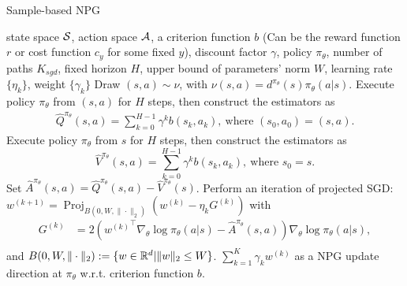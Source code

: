 \begin{algorithm}[htb!]
   \caption{Sample-based NPG}
   \label{Algorithm_sample_based_NPG}
\begin{algorithmic}
    state space ${\mathcal{S}}$, action space ${\mathcal{A}}$, a criterion function $b$ (Can be the reward function $r$ or cost function $c_y$ for some fixed $y$), discount factor $\gamma$, policy $\pi_\theta$, number of paths $K_{sgd}$, fixed horizon $H$, upper bound of parameters' norm $W$, learning rate $\{\eta_k\}$, weight $\{\gamma_k\}$
      \STATE Draw $(s,a)\sim \nu$, with $\nu(s,a)=d^{\pi_\theta}(s)\pi_\theta(a|s)$.
   \STATE Execute policy $\pi_\theta$ from $(s,a)$ for $H$ steps, then construct the estimators as
   $$
   \begin{aligned}
   \widehat Q^{\pi_\theta}(s,a)=\sum^{H-1}_{k=0} \gamma^k b(s_k,a_k),\ \text{where } (s_0,a_0)=(s,a).
   \end{aligned}
   $$
   \STATE Execute policy $\pi_\theta$ from $s$ for $H$ steps, then construct the estimators as
   $$
   \widehat V^{\pi_\theta}(s,a)=\sum^{H-1}_{k=0} \gamma^k b(s_k,a_k),\ \text{where } s_0=s.
   $$
   \STATE Set $\widehat A^{\pi_\theta}(s,a)=\widehat Q^{\pi_\theta}(s,a)-\widehat V^{\pi_\theta}(s)$.
   \STATE Perform an iteration of projected SGD: $w^{(k+1)}=\operatorname{Proj}_{B(0,W,\|\cdot\|_2)}(w^{(k)}-\eta_k G^{(k)})$ with
   $$
   \begin{aligned}
      G^{(k)}&=2({w^{(k)}}^\top\nabla_\theta\log\pi_\theta(a|s)-\widehat A^{\pi_\theta}(s,a))\nabla_\theta\log\pi_\theta(a|s),\\
   \end{aligned}
   $$
   and $B(0,W,\|\cdot\|_2):=\{w\in{\mathbb R}^d|\|w\|_2\leq W\}$.
   \ENDFOR
    $\sum_{k=1}^K \gamma_k w^{(k)}$ as a NPG update direction at $\pi_\theta$ w.r.t. criterion function $b$.
\end{algorithmic}
\end{algorithm}



